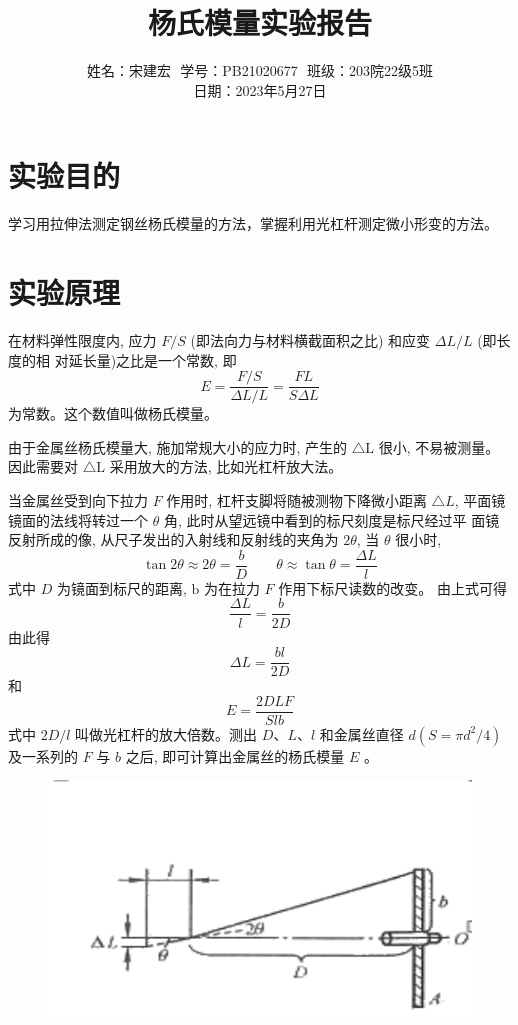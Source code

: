 \documentclass{article}
\title{杨氏模量实验报告}
\author{姓名：宋建宏\,\, 学号：PB21020677\,\, 班级：203院22级5班\\ 日期：2023年5月27日}
\date{}
\begin{document}
\maketitle

\section*{实验目的}
学习用拉伸法测定钢丝杨氏模量的方法，掌握利用光杠杆测定微小形变的方法。

\section*{实验原理}
在材料弹性限度内, 应力 $F / S$ (即法向力与材料横截面积之比) 和应变 $\Delta L / L$ (即长度的相 对延长量)之比是一个常数, 即
$$
    E=\frac{F / S}{\Delta L / L}=\frac{FL}{S \Delta L}
$$
为常数。这个数值叫做杨氏模量。

由于金属丝杨氏模量大, 施加常规大小的应力时, 产生的 $\triangle \mathrm{L}$ 很小, 不易被测量。因此需要对 $\triangle \mathrm{L}$ 采用放大的方法, 比如光杠杆放大法。

当金属丝受到向下拉力 $F$ 作用时, 杠杆支脚将随被测物下降微小距离 $\triangle L$, 平面镜镜面的法线将转过一个 $\theta$ 角, 此时从望远镜中看到的标尺刻度是标尺经过平 面镜反射所成的像, 从尺子发出的入射线和反射线的夹角为 $2 \theta$,  当 $\theta$ 很小时,
$$
    \tan 2 \theta \approx 2 \theta=\frac{b}{D}\quad\quad \theta \approx \tan \theta =\frac{\Delta L}{l}
$$
式中 $D$ 为镜面到标尺的距离, $\mathrm{b}$ 为在拉力 $F$ 作用下标尺读数的改变。
由上式可得
$$
    \frac{\Delta L}{l}=\frac{b}{2 D}
$$
由此得
$$
    \Delta L=\frac{b l}{2 D}
$$
和
$$
    E=\frac{2 D L F}{S l b}
$$
式中 $2 D / l$ 叫做光杠杆的放大倍数。测出 $D 、 L 、 l$ 和金属丝直径 $d\left(S=\pi d^2 / 4\right)$ 及一系列的 $F$ 与 $b$ 之后, 即可计算出金属丝的杨氏模量 $E$ 。
\begin{figure}[htbp]
    \centering
    \includegraphics*[scale=0.7]{figure.png}
\end{figure}
\end{document}
